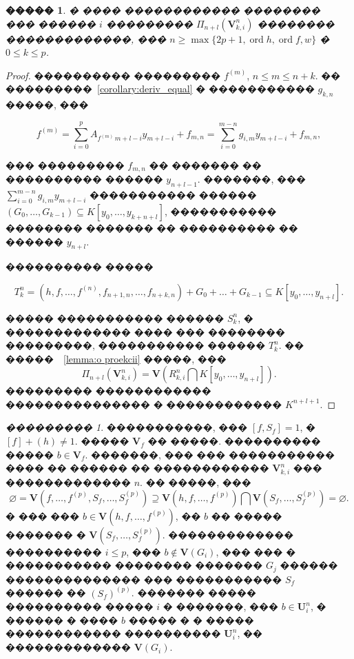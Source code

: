 \documentclass[16pt]{article}
\DeclareMathOperator{\ord}{ord}
\theoremstyle{plain}
\newtheorem{lemma}[theorem]{�����}
\theoremstyle{definition}
\theoremstyle{remark}
\newtheorem{remark}[theorem]{���������}
\begin{document}
\begin{lemma} \label{lemma:o_ideale}
 � ���� ������������ �������� ��� ������ $i$ ��������� $\Pi_{n+l}(\mathbf{V}_{k,i}^n)$ �������� �������������, ��� $n \geqslant\max\{ 2p+1,\ord{h},\ord{f},w\}$ �  $0\leqslant k\leqslant p$.
\end{lemma}

\begin{proof}
���������� ��������� $ f^{(m)}$, $n\leqslant m\leqslant n+k$. �� ���������~\ref{corollary:deriv_equal} � ����������� $g_{k,n}$ �����, ���

$$
f^{(m)}= \sum\limits_{i=0}^{p} A_{f^{(m)}\,m+l -i}y_{m+l -i} + f_{m,n}=\sum\limits_{i=0}^{m-n} g_{i,m}y_{m+l -i} + f_{m,n},
$$

��� ��������� $f_{m,n}$ �� ������� �� ���������� ������ $y_{n+l-1}$. �������, ��� $\sum\limits_{i=0}^{m-n} g_{i,m}y_{m+l -i}$ ����������� ������  $(G_0,\ldots, G_{k-1})\subseteq K[y_0,\ldots,y_{k+n+l}]$,  ����������� �������� ������� �� ���������� �� ������ $y_{n+l}$.

���������� �����

$$
T_k^n=(h,f,\ldots,f^{(n)},f_{n+1,n},\ldots,f_{n+k,n}) + G_0+\ldots+ G_{k-1}\subseteq K[y_0,\ldots,y_{n+l}].
$$

����� ����������� ������ $S_k^n$, � ������������� ���� ��� �������� ���������, ����������� ������ $T_k^n$. �� �����~~\ref{lemma:o proekcii} �����, ���
$$
\Pi_{n+l}(\mathbf{V}_{k,i}^n)=\mathbf{V}(R_{k,i}^n\bigcap K[y_0,\ldots,y_{n+l}]).
$$
��������� ������������ ��������������� � ������������ $K^{n+l+1}$.
\end{proof}


\begin{remark}\label{remark:o_prinadleznosti_reshenia}
�����������, ��� $[f,S_f]=1$, � $[f]+(h)\neq 1$. ����� $\mathbf{V}_{f}$ �� �����. ���������� ����� $b\in\mathbf{V}_{f}$. �������, ��� ��� ����������� ���� �� ������ �� ������������ $\mathbf{V}_{k,i}^n$ ��� ������������� $n$. �� �����, ��� 
$$
\varnothing=\mathbf{V}(f,\ldots,f^{(p)},S_f,\ldots,S_f^{(p)})\supseteq \mathbf{V}(h,f,\ldots,f^{(p)})\bigcap\mathbf{V}(S_f,\ldots,S_f^{(p)})=\varnothing.
$$
 � ��� ��� $b\in \mathbf{V}(h,f,\ldots,f^{(p)})$, �� $b$ �� ����� ������� � $\mathbf{V}(S_f,\ldots,S_f^{(p)})$. ������������� ���������� $i\leqslant p$, ��� $b \not\in \mathbf{V}(G_i)$, ��� ���  � ����������� �������� ������� $G_j$ ������ �������������� ��� ����������� $S_f$ ������ �� $(S_f)^{(p)}$. ������� ����� ���������� ����� $i$ � �������, ��� $b\in \mathbf{U}_{i}^n$, � ������ � ���� $b$ ����� � � ����� ������������ ���������� $\mathbf{U}_{i}^n$, �� ������������� $\mathbf{V}(G_{i})$.
\end{remark}
\end{document}
